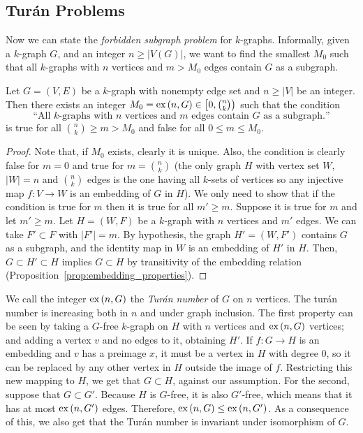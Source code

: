 \subsection{Turán Problems}\label{subsec:turan}

Now we can state the \emph{forbidden subgraph problem} for $k$-graphs.
Informally, given a $k$-graph $G$, and an integer $n \geq |V(G)|$,
we want to find the smallest $M_0$ such that all $k$-graphs with $n$ vertices and $m > M_0$ edges
contain $G$ as a subgraph.

\begin{proposition} \label{prop:extremal}
    Let $G = (V, E)$ be a $k$-graph with nonempty edge set and $n \geq |V|$ be an integer.
    Then there exists an integer $M_0 = \text{ex} \left( n, G \right) \in \left[ 0, \binom{n}{k}\right)$ such that
    the condition
    \[
        \text{``All $k$-graphs with $n$ vertices and $m$ edges contain $G$ as a subgraph.''}
    \]
    is true for all $\binom{n}{k} \geq m > M_0$ and false for all $0 \leq m \leq M_0$.

    \begin{proof}
        Note that, if $M_0$ exists, clearly it is unique.
        Also, the condition is clearly false for $m = 0$ and
        true for $m = \binom{n}{k}$
        (the only graph $H$ with vertex set $W$, $|W|=n$ and $\binom{n}{k}$ edges
        is the one having all $k$-sets of vertices so any injective map $f: V \to W$
        is an embedding of $G$ in $H$).
        We only need to show that if the condition is true for $m$ then it is true for
        all $m' \geq m$.
        Suppose it is true for $m$ and let $m' \geq m$.
        Let $H = (W, F)$ be a $k$-graph with $n$ vertices and $m'$ edges.
        We can take $F' \subset F$ with $|F'| = m$.
        By hypothesis, the graph $H' = (W, F')$ contains $G$ as a subgraph,
        and the identity map in $W$ is an embedding of $H'$ in $H$.
        Then, $G \subset H' \subset H$ implies $G \subset H$ by transitivity of the embedding
        relation (Proposition~\ref{prop:embedding_properties}).

    \end{proof}

\end{proposition}

We call the integer $\text{ex} \left( n, G \right)$ the \emph{Turán number} of $G$ on $n$ vertices.
The turán number is increasing both in $n$ and under graph inclusion.
The first property can be seen by taking a $G$-free $k$-graph on $H$ with $n$ vertices
and $\text{ex} \left( n, G \right)$ vertices; and adding a vertex $v$ and no edges to it, obtaining $H'$.
If $f: G \to H$ is an embedding and $v$ has a preimage $x$, it must be a vertex in $H$ with degree $0$,
so it can be replaced by any other vertex in $H$ outside the image of $f$.
Restricting this new mapping to $H$, we get that $G \subset H$, against our assumption.
For the second, suppose that $G \subset G'$.
Because $H$ is $G$-free, it is also $G'$-free, which means that it has at most $\text{ex} \left( n, G' \right)$ edges.
Therefore, $\text{ex} \left( n, G \right) \leq \text{ex} \left( n, G' \right)$.
As a consequence of this, we also get that the Turán number is invariant under isomorphism of $G$.

